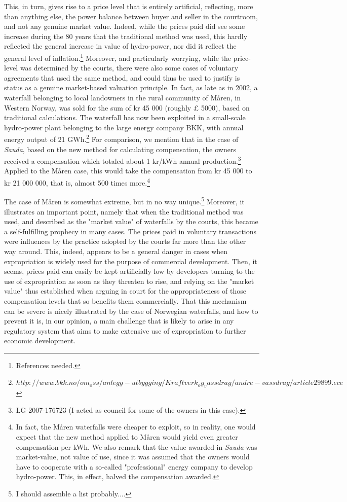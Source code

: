 This, in turn, gives rise to a price level that is entirely artificial, reflecting, more than anything else, the power balance between buyer and seller in the courtroom, and not any genuine market value. Indeed, while the prices paid did see some increase during the 80 years that the traditional method was used, this hardly reflected the general increase in value of hydro-power, nor did it reflect the general level of inflation.\footnote{References needed.} Moreover, and particularly worrying, while the price-level was determined by the courts, there were also some cases of voluntary agreements that used the same method, and could thus be used to justify is status as a genuine market-based valuation principle. In fact, as late as in 2002, a waterfall belonging to local landowners in the rural community of Måren, in Western Norway, was sold for the sum of kr 45 000 (roughly £ 5000), based on traditional calculations. The waterfall has now been exploited in a small-scale hydro-power plant belonging to the large energy company BKK, with annual energy output of 21 GWh.\footnote{$http://www.bkk.no/om_oss/anlegg-utbygging/Kraftverk_og_vassdrag/andre-vassdrag/article29899.ece$} For comparison, we mention that in the case of \emph{Sauda}, based on the new method for calculating compensation, the owners received a compensation which totaled about 1 kr/kWh annual production.\footnote{LG-2007-176723 (I acted as council for some of the owners in this case).} Applied to the Måren case, this would take the compensation from kr 45 000 to kr 21 000 000, that is, almost 500 times more.\footnote{In fact, the Måren waterfalls were cheaper to exploit, so in reality, one would expect that the new method applied to Måren would yield even greater compensation per kWh. We also remark that the value awarded in \emph{Sauda} was market-value, not value of use, since it was assumed that the owners would have to cooperate with a so-called "professional" energy company to develop hydro-power. This, in effect, halved the compensation awarded.}

The case of Måren is somewhat extreme, but in no way unique.\footnote{I should assemble a list probably....} Moreover, it illustrates an important point, namely that when the traditional method was used, and described as the "market value" of waterfalls by the courts, this became a self-fulfilling prophecy in many cases. The prices paid in voluntary transactions were influences by the practice adopted by the courts far more than the other way around. This, indeed, appears to be a general danger in cases when expropriation is widely used for the purpose of commercial development. Then, it seems, prices paid can easily be kept artificially low by developers turning to the use of expropriation as soon as they threaten to rise, and relying on the "market value" thus established when arguing in court for the appropriateness of those compensation levels that so benefits them commercially. That this mechanism can be severe is nicely illustrated by the case of Norwegian waterfalls, and how to prevent it is, in our opinion, a main challenge that is likely to arise in any regulatory system that aims to make extensive use of expropriation to further economic development.

